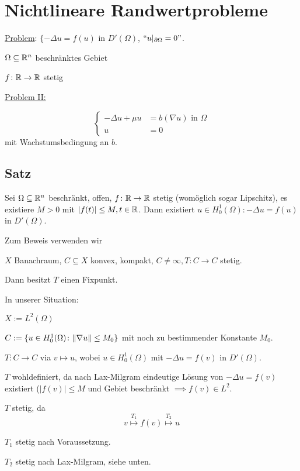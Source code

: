 \section{Nichtlineare Randwertprobleme}

\underline{Problem}: $\{-\Delta u = f(u)$ in $D'(\Omega)$, $``u|_{\partial \Omega} = 0"$.

$\Omega \subseteq \mathbb{R}^n$ beschränktes Gebiet

$f \colon \mathbb{R} \to \mathbb{R}$ stetig

\underline{Problem II:}

$$
\begin{cases}
  - \Delta u +  \mu u &= b(\nabla u) \text{ in } \Omega \\
  u &= 0
\end{cases}
$$
mit Wachstumsbedingung an $b$.

\subsection{Satz}

Sei $\Omega \subseteq \mathbb{R}^n$ beschränkt, offen, $f \colon \mathbb{R} \to \mathbb{R}$ stetig (womöglich sogar Lipschitz), es existiere $M > 0$ mit $|f(t)| \leq M, t \in \mathbb{R}$.
Dann existiert $u \in H_0^1(\Omega) : -\Delta u = f(u)$ in $D'(\Omega)$.

Zum Beweis verwenden wir

\begin{thm}
 $X$ Banachraum, $C \subseteq X$ konvex, kompakt, $C \neq \infty, T \colon C \to C$ stetig.
 
 Dann besitzt $T$ einen Fixpunkt.
\end{thm}

In unserer Situation: 

$X := L^2(\Omega)$

$C := \{u \in H_0^1(\Omega) \colon \lVert \nabla u \rVert \leq M_0\}$ mit noch zu bestimmender Konstante $M_0$.

$T \colon C \to C$ via $v \mapsto u$, wobei $u \in H_0^1(\Omega)$ mit $-\Delta u = f(v)$ in $D'(\Omega)$.

$T$ wohldefiniert, da nach Lax-Milgram eindeutige Lösung von $-\Delta u = f(v)$ existiert ($|f(v)| \leq M$ und Gebiet beschränkt $\implies f(v) \in L^2$.

$T$ stetig, da
$$
v \overset{T_1}{\mapsto} f(v) \overset{T_2}{\mapsto} u
$$

$T_1$ stetig nach Voraussetzung.

$T_2$ stetig nach Lax-Milgram, siehe unten.

